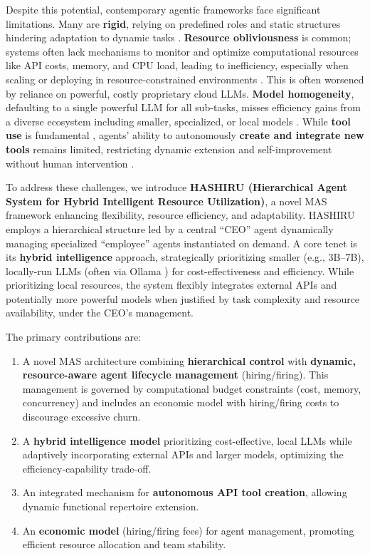 \documentclass[conference]{IEEEtran}
\begin{document}
Despite this potential, contemporary agentic frameworks face significant limitations. Many are \textbf{rigid}, relying on predefined roles and static structures hindering adaptation to dynamic tasks \cite{zhang2023building}. \textbf{Resource obliviousness} is common; systems often lack mechanisms to monitor and optimize computational resources like API costs, memory, and CPU load, leading to inefficiency, especially when scaling or deploying in resource-constrained environments \cite{park2023generative}. This is often worsened by reliance on powerful, costly proprietary cloud LLMs. \textbf{Model homogeneity}, defaulting to a single powerful LLM for all sub-tasks, misses efficiency gains from a diverse ecosystem including smaller, specialized, or local models \cite{zhou2023agents}. While \textbf{tool use} is fundamental \cite{yao2022react, parisi2022talm}, agents' ability to autonomously \textbf{create and integrate new tools} remains limited, restricting dynamic extension and self-improvement without human intervention \cite{wang2023voyager}.

To address these challenges, we introduce \textbf{HASHIRU (Hierarchical Agent System for Hybrid Intelligent Resource Utilization)}, a novel MAS framework enhancing flexibility, resource efficiency, and adaptability. HASHIRU employs a hierarchical structure led by a central ``CEO'' agent dynamically managing specialized ``employee'' agents instantiated on demand. A core tenet is its \textbf{hybrid intelligence} approach, strategically prioritizing smaller (e.g., 3B--7B), locally-run LLMs (often via Ollama \cite{ollama}) for cost-effectiveness and efficiency. While prioritizing local resources, the system flexibly integrates external APIs and potentially more powerful models when justified by task complexity and resource availability, under the CEO's management.

The primary contributions are:
\begin{enumerate}
    \item A novel MAS architecture combining \textbf{hierarchical control} with \textbf{dynamic, resource-aware agent lifecycle management} (hiring/firing). This management is governed by computational budget constraints (cost, memory, concurrency) and includes an economic model with hiring/firing costs to discourage excessive churn.
    \item A \textbf{hybrid intelligence model} prioritizing cost-effective, local LLMs while adaptively incorporating external APIs and larger models, optimizing the efficiency-capability trade-off.
    \item An integrated mechanism for \textbf{autonomous API tool creation}, allowing dynamic functional repertoire extension.
    \item An \textbf{economic model} (hiring/firing fees) for agent management, promoting efficient resource allocation and team stability.
\end{enumerate}
\end{document}
